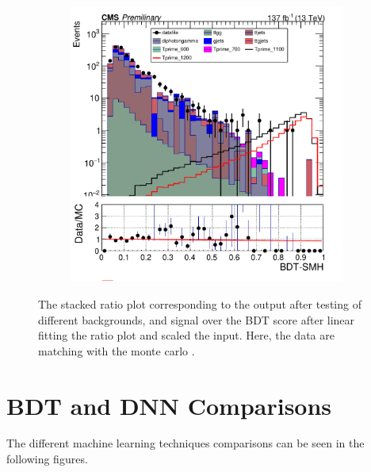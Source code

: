 \begin{figure}
\begin{subfigure}[b]{0.3\textwidth}
         \label{fig:three sin x}
     \end{subfigure}
     \hfill
     \begin{subfigure}[b]{0.3\textwidth}
         \centering
         \includegraphics[width=\textwidth]{BDT_Output/Stacked_plot_BDT_1100-1200_with_diphoton_cuts_with_scaled_inputs.pdf}
         \label{fig:five over x}
     \end{subfigure}
        \caption{The stacked ratio plot corresponding to the output after testing of different backgrounds, and signal over the BDT score after linear fitting the ratio plot and scaled the input. Here, the data are matching with the monte carlo .}
        \label{fig:BDT_ouput_Fitted_with}
\end{figure}


\section{BDT and DNN Comparisons}\label{sec:comp}
The different machine learning techniques comparisons can be seen in the following figures.

